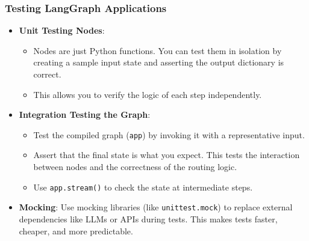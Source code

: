 \begin{frame}[fragile]\frametitle{Testing LangGraph Applications}
      \begin{itemize}
        \item \textbf{Unit Testing Nodes}:
        \begin{itemize}
            \item Nodes are just Python functions. You can test them in isolation by creating a sample input state and asserting the output dictionary is correct.
            \item This allows you to verify the logic of each step independently.
        \end{itemize}
        \item \textbf{Integration Testing the Graph}:
        \begin{itemize}
            \item Test the compiled graph (\texttt{app}) by invoking it with a representative input.
            \item Assert that the final state is what you expect. This tests the interaction between nodes and the correctness of the routing logic.
            \item Use \texttt{app.stream()} to check the state at intermediate steps.
        \end{itemize}
        \item \textbf{Mocking}: Use mocking libraries (like \texttt{unittest.mock}) to replace external dependencies like LLMs or APIs during tests. This makes tests faster, cheaper, and more predictable.
      \end{itemize}
\end{frame}
